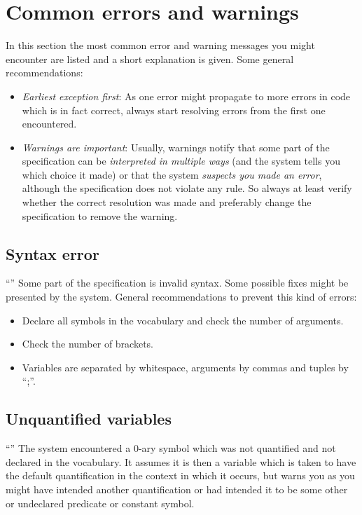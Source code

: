 \section{Common errors and warnings}
In this section the most common error and warning messages you might encounter are listed and a short explanation is given.
Some general recommendations:
\begin{itemize}
  \item \emph{Earliest exception first}: As one error might propagate to more errors in code which is in fact correct, always start resolving errors from the first one encountered.
  \item \emph{Warnings are important}: Usually, warnings notify that some part of the specification can be \emph{interpreted in multiple ways} (and the system tells you which choice it made) or that the system \emph{suspects you made an error}, although the specification does not violate any rule. So always at least verify whether the correct resolution was made and preferably change the specification to remove the warning.
\end{itemize}

\subsection{Syntax error}
``''
Some part of the specification is invalid \fodotidp syntax. Some possible fixes might be presented by the system.
General recommendations to prevent this kind of errors:
\begin{itemize}
  \item Declare all symbols in the vocabulary and check the number of arguments.
  \item Check the number of brackets.
  \item Variables are separated by whitespace, arguments by commas and tuples by ``;''.
\end{itemize}

\subsection{Unquantified variables}
``''
The system encountered a 0-ary symbol which was not quantified and not declared in the vocabulary.
It assumes it is then a variable which is taken to have the default quantification in the context in which it occurs, but warns you as you might have intended another quantification or had intended it to be some other or undeclared predicate or constant symbol.

